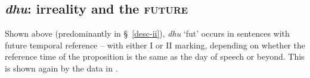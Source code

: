 




\subsection{\textit{dhu}: irreality and the \textsc{future}}

Shown above (predominantly in \S~\ref{desc-ii}),  \textit{dhu} `\gls{fut}' occurs in sentences with future temporal reference -- with either \gls{I} or \gls{II} marking, depending on whether the reference time of the proposition is the same as the day of speech or beyond. This is shown again by the data in .

